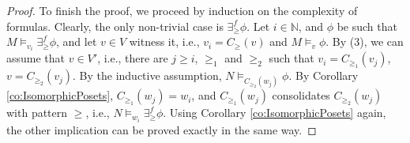 \documentclass[12pt]{amsart}
\theoremstyle{plain}
\newcommand \fr{\scriptscriptstyle{f}}
\newcommand \NN{\mathbb{N}}
\newcommand \PPb{\mathbb{P}}
\begin{document}
\begin{proof}
		
		To finish the proof, we proceed by induction on the complexity of formulas. Clearly, the only non-trivial case is $\exists^{\fr}_{\geq} \phi$. Let $i \in \NN$, and $\phi$ be such that $M \models_{v_i} \exists^{\fr}_{\geq} \phi$, and let $v \in V$ witness it, i.e., $v_i=C_{ \geq} (v)$ and $M \models_v \phi$.  By (3), we can assume that $v \in V'$, i.e., there are $j \geq i$, $\geq_1$ and $\geq_2$ such that $v_i=C_{\geq_1}(v_j)$, $v=C_{\geq_2}(v_j)$. By the inductive assumption, $N \models_{C_{\geq_2}(w_j)} \phi$. By Corollary \ref{co:IsomorphicPosets}, $C_{\geq_1}(w_j)=w_i$, and $C_{\geq_1}(w_j)$ consolidates  $C_{\geq_2}(w_j)$ with pattern $\geq$, i.e., $N \models_{w_i} \exists^{\fr}_{\geq} \phi$. Using Corollary \ref{co:IsomorphicPosets} again, the other implication can be proved exactly in the same way.
		
	\end{proof}
	
	
\end{document}
